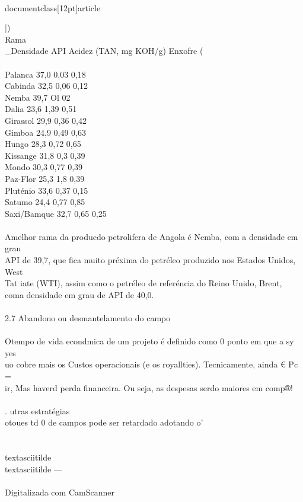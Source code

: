 \\documentclass[12pt]{article}
\begin{document}
|)\\
Rama \\_Densidade API Acidez (TAN, mg KOH/g) Enxofre (\\%
\\
Palanca 37,0 0,03 0,18\\
Cabinda 32,5 0,06 0,12\\
Nemba 39,7 Ol 02\\
Dalia 23,6 1,39 0,51\\
Girassol 29,9 0,36 0,42\\
Gimboa 24,9 0,49 0,63\\
Hungo 28,3 0,72 0,65\\
Kissange 31,8 0,3 0,39\\
Mondo 30,3 0,77 0,39\\
Paz-Flor 25,3 1,8 0,39\\
Pluténio 33,6 0,37 0,15\\
Satumo 24,4 0,77 0,85\\
Saxi/Bamque 32,7 0,65 0,25\\
\\
Amelhor rama da producdo petrolifera de Angola é Nemba, com a densidade em grau\\
API de 39,7, que fica muito préxima do petréleo produzido nos Estados Unidos, West\\
Tat iate (WTI), assim como o petréleo de referéncia do Reino Unido, Brent,\\
coma densidade em grau de API de 40,0.\\
\\
2.7 Abandono ou desmantelamento do campo\\
\\
Otempo de vida econdmica de um projeto é definido como 0 ponto em que a sy yes\\
uo cobre mais os Custos operacionais (e os royallties). Tecnicamente, ainda € Pc =\\
ir, Mas haverd perda financeira. Ou seja, as despesas serdo maiores em comp®!\\
\\
. utras estratégias\\
otoues td 0 de campos pode ser retardado adotando o'\\
\\
\\textasciitilde{}\\textasciitilde{} —\\
\\
Digitalizada com CamScanner\\
\end{document}
